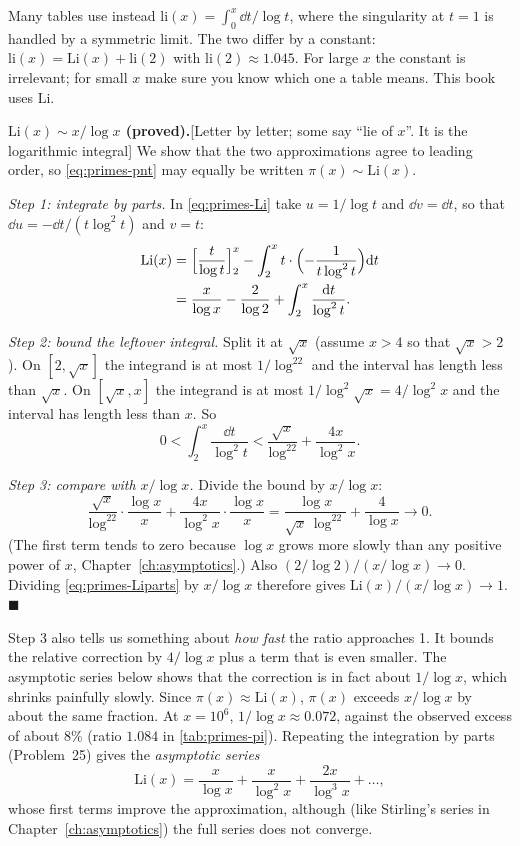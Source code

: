 \begin{pitfall}
Many tables use instead $\mathrm{li}(x)=\int_0^x\dd t/\log t$, where the singularity at $t=1$ is handled by a symmetric limit. The two differ by a constant: $\mathrm{li}(x)=\mathrm{Li}(x)+\mathrm{li}(2)$ with $\mathrm{li}(2)\approx1.045$. For large $x$ the constant is irrelevant; for small $x$ make sure you know which one a table means. This book uses $\mathrm{Li}$.
\end{pitfall}

\textbf{$\mathrm{Li}(x)\sim x/\log x$ (proved).}[Letter by letter; some say ``lie of $x$''. It is the logarithmic integral] We show that the two approximations agree to leading order, so \cref{eq:primes-pnt} may equally be written $\pi(x)\sim\mathrm{Li}(x)$.

\emph{Step 1: integrate by parts.} In \cref{eq:primes-Li} take $u=1/\log t$ and $\dd v=\dd t$, so that $\dd u=-\dd t/(t\log^2t)$ and $v=t$:
\begin{align}
\mathrm{Li}(x) &= \Bigl[\frac{t}{\log t}\Bigr]_2^x - \int_2^x t\cdot\Bigl(-\frac{1}{t\log^2t}\Bigr)\mathrm{d} t \notag\\
&= \frac{x}{\log x}-\frac{2}{\log2}+\int_2^x\frac{\mathrm{d} t}{\log^2t}.
\label{eq:primes-Liparts}
\end{align}

\emph{Step 2: bound the leftover integral.} Split it at $\sqrt x$ (assume $x>4$ so that $\sqrt x>2$). On $[2,\sqrt x]$ the integrand is at most $1/\log^22$ and the interval has length less than $\sqrt x$. On $[\sqrt x,x]$ the integrand is at most $1/\log^2\sqrt x=4/\log^2x$ and the interval has length less than $x$. So
\[
0<\int_2^x\frac{\dd t}{\log^2t} < \frac{\sqrt x}{\log^22}+\frac{4x}{\log^2x}.
\]

\emph{Step 3: compare with $x/\log x$.} Divide the bound by $x/\log x$:
\[
\frac{\sqrt x}{\log^22}\cdot\frac{\log x}{x}+\frac{4x}{\log^2x}\cdot\frac{\log x}{x}=\frac{\log x}{\sqrt x\,\log^22}+\frac{4}{\log x}\longrightarrow0 .
\]
(The first term tends to zero because $\log x$ grows more slowly than any positive power of $x$, Chapter~\ref{ch:asymptotics}.) Also $(2/\log2)/(x/\log x)\to0$. Dividing \cref{eq:primes-Liparts} by $x/\log x$ therefore gives $\mathrm{Li}(x)/(x/\log x)\to1$. $\blacksquare$

Step 3 also tells us something about \emph{how fast} the ratio approaches 1. It bounds the relative correction by $4/\log x$ plus a term that is even smaller. The asymptotic series below shows that the correction is in fact about $1/\log x$, which shrinks painfully slowly. Since $\pi(x)\approx\mathrm{Li}(x)$, $\pi(x)$ exceeds $x/\log x$ by about the same fraction. At $x=10^6$, $1/\log x\approx0.072$, against the observed excess of about $8\%$ (ratio $1.084$ in \cref{tab:primes-pi}). Repeating the integration by parts (Problem~25) gives the \emph{asymptotic series}
\[
\mathrm{Li}(x)=\frac{x}{\log x}+\frac{x}{\log^2x}+\frac{2x}{\log^3x}+\dots,
\]
whose first terms improve the approximation, although (like Stirling's series in Chapter~\ref{ch:asymptotics}) the full series does not converge.

